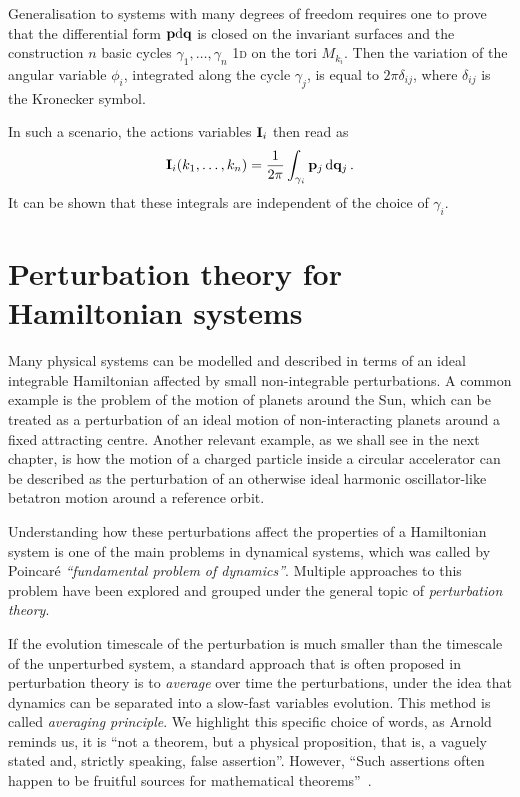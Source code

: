 Generalisation to systems with many degrees of freedom requires one to prove that the differential form $\vb{p}\dd \vb{q}$ is closed on the invariant surfaces and the construction $n$ basic cycles $\gamma_1,\dots, \gamma_n$ 1\textsc{d} on the tori $M_{k_i}$. Then the variation of the angular variable $\phi_i$, integrated along the cycle $\gamma_j$, is equal to $2\pi\delta_{ij}$, where $\delta_{ij}$ is the Kronecker symbol.

In such a scenario, the actions variables $\vb{I}_i$ then read as
%
\begin{equation}
    \vb{I}_i(k_1,\dots,k_n) = \frac{1}{2\pi}\int_{\gamma_i} \vb{p}_j\, \dd \vb{q}_j\, .  
\end{equation} 
%
It can be shown that these integrals are independent of the choice of $\gamma_i$.~\cite{Arnold:937549}

\section{Perturbation theory for Hamiltonian systems}\label{sec:1:averaging}

Many physical systems can be modelled and described in terms of an ideal integrable Hamiltonian affected by small non-integrable perturbations. A common example is the problem of the motion of planets around the Sun, which can be treated as a perturbation of an ideal motion of non-interacting planets around a fixed attracting centre. Another relevant example, as we shall see in the next chapter, is how the motion of a charged particle inside a circular accelerator can be described as the perturbation of an otherwise ideal harmonic oscillator-like betatron motion around a reference orbit.

Understanding how these perturbations affect the properties of a Hamiltonian system is one of the main problems in dynamical systems, which was called by Poincaré \textit{``fundamental problem of dynamics''}. Multiple approaches to this problem have been explored and grouped under the general topic of \textit{perturbation theory}.

If the evolution timescale of the perturbation is much smaller than the timescale of the unperturbed system, a standard approach that is often proposed in perturbation theory is to \textit{average} over time the perturbations, under the idea that dynamics can be separated into a slow-fast variables evolution. This method is called \textit{averaging principle}. We highlight this specific choice of words, as Arnold reminds us, it is ``not a theorem, but a physical proposition, that is, a vaguely stated and, strictly speaking, false assertion''. However, ``Such assertions often happen to be fruitful sources for mathematical theorems''~\cite{Arnold:937549}.

